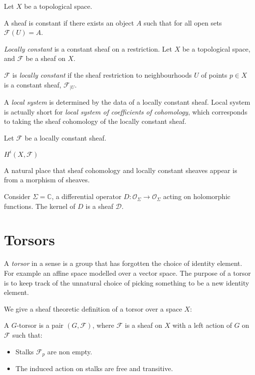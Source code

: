     Let \(X\) be a topological space.
    \begin{defn}
    A sheaf is constant if there exists an object \(A\) such that for all open sets \( \mathcal{F}(U) = A\).
    \end{defn}
    
    \emph{Locally constant} is a constant sheaf on a restriction.
    Let \(X\) be a topological space, and \( \mathcal{F}\) be a sheaf on \(X\).
    
    \begin{defn}
    \( \mathcal{F}\) is \emph{locally constant} if the sheaf restriction to neighbourhoods \(U\) of points \( p \in X\)  is a constant sheaf,
    \( \mathcal{F}_{|U}\).
    \end{defn}

    A \emph{local system} is determined by the data of a locally constant sheaf. Local system is actually short for \emph{local system of coefficients of cohomology}, which corresponds to taking the sheaf cohomology of the locally constant sheaf.
    
    Let \( \mathcal{F}\) be a locally constant sheaf.    
    \begin{defn}
    \( H^i(X,\mathcal{F})\)
    \end{defn}
    
    A natural place that sheaf cohomology and locally constant sheaves appear is from a morphism of sheaves.
    \begin{ex}
    Consider \(\Sigma = \mathbb{C}\), a differential operator \( D: \mathcal{O}_\Sigma \rightarrow \mathcal{O}_\Sigma\) acting on holomorphic functions.  The kernel of \(D\) is a sheaf \( \mathcal{D}\).
    
    \end{ex}
    
    \section{Torsors}
    A \emph{torsor} in a sense is a group that has forgotten the choice of identity element. For example an affine space modelled over a vector space. The purpose of a torsor is to keep track of the unnatural choice of picking something to be a new identity element.
    
    We give a sheaf theoretic definition of a torsor \cite{sheaves_logic} over a space \(X \):
    \begin{defn}[Torsor] 
    A \(G\)-torsor is a pair \((G,\mathcal{F})\), where \( \mathcal{F}\) is a sheaf on \(X\) with a left action of \(G\) on \( \mathcal{F}\) such that:
    \begin{itemize}
        \item Stalks \( \mathcal{F}_p\) are non empty.
        \item The induced action on stalks are free and transitive.
    \end{itemize}
    \end{defn}
    
